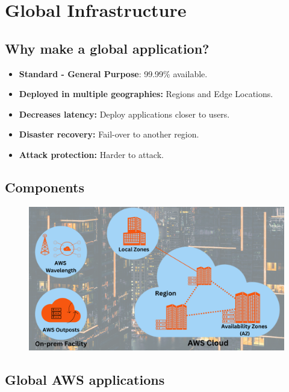 \section{Global Infrastructure}\label{sec:global-infrastructure}

\subsection{Why make a global application?}\label{subsec:why-make-a-global-application}

\begin{itemize}
    \item{\textbf{Standard - General Purpose}: 99.99\% available.}
    \item{\textbf{Deployed in multiple geographies:}} Regions and Edge Locations.
    \item{\textbf{Decreases latency:}} Deploy applications closer to users.
    \item{\textbf{Disaster recovery:}} Fail-over to another region.
    \item{\textbf{Attack protection:}} Harder to attack.
\end{itemize}

\subsection{Components}\label{subsec:global-application-components}

\begin{figure}[h]
    \includegraphics[scale=0.20]{global-infrastructure/global-infrastructure}
    \centering
    \label{fig:global-infrastructure}
\end{figure}

\subsection{Global AWS applications}\label{subsec:global-aws-applications}

